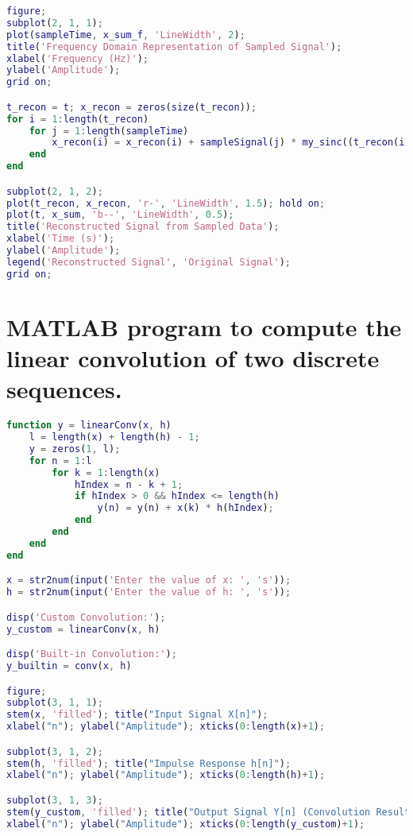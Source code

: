 \documentclass{article}
\begin{document}
\begin{lstlisting}[language=matlab, caption=MATLAB program to verify the Sampling Theorem]
figure;
subplot(2, 1, 1);
plot(sampleTime, x_sum_f, 'LineWidth', 2); 
title('Frequency Domain Representation of Sampled Signal');
xlabel('Frequency (Hz)');
ylabel('Amplitude');
grid on;

t_recon = t; x_recon = zeros(size(t_recon));
for i = 1:length(t_recon)
    for j = 1:length(sampleTime)
        x_recon(i) = x_recon(i) + sampleSignal(j) * my_sinc((t_recon(i) - sampleTime(j)) / t_nq);
    end
end

subplot(2, 1, 2);
plot(t_recon, x_recon, 'r-', 'LineWidth', 1.5); hold on;
plot(t, x_sum, 'b--', 'LineWidth', 0.5); 
title('Reconstructed Signal from Sampled Data');
xlabel('Time (s)');
ylabel('Amplitude');
legend('Reconstructed Signal', 'Original Signal');
grid on;

\end{lstlisting}

\section{MATLAB program to compute the linear convolution of two discrete sequences.}
\begin{lstlisting}[language=matlab, caption=MATLAB program to compute the linear convolution of two discrete sequences]
function y = linearConv(x, h)
    l = length(x) + length(h) - 1;
    y = zeros(1, l);
    for n = 1:l
        for k = 1:length(x)
            hIndex = n - k + 1;
            if hIndex > 0 && hIndex <= length(h)
                y(n) = y(n) + x(k) * h(hIndex);
            end
        end
    end
end

x = str2num(input('Enter the value of x: ', 's'));
h = str2num(input('Enter the value of h: ', 's'));

disp('Custom Convolution:');
y_custom = linearConv(x, h)

disp('Built-in Convolution:');
y_builtin = conv(x, h)

figure;
subplot(3, 1, 1);
stem(x, 'filled'); title("Input Signal X[n]"); 
xlabel("n"); ylabel("Amplitude"); xticks(0:length(x)+1);

subplot(3, 1, 2);
stem(h, 'filled'); title("Impulse Response h[n]"); 
xlabel("n"); ylabel("Amplitude"); xticks(0:length(h)+1);

subplot(3, 1, 3);
stem(y_custom, 'filled'); title("Output Signal Y[n] (Convolution Result)"); 
xlabel("n"); ylabel("Amplitude"); xticks(0:length(y_custom)+1);

\end{lstlisting}
\end{document}
